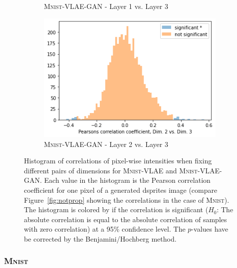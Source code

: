 \begin{figure}
\begin{subfigure}{.3\textwidth}
        \caption{\textsc{Mnist}-VLAE-GAN - Layer 1 vs. Layer 3}
    \end{subfigure}
    \hfill
    \begin{subfigure}{.3\textwidth}
        \includegraphics[width=\textwidth]{images/notprop/dsprites/vlae_gan/dim_2_3.png}
        \caption{\textsc{Mnist}-VLAE-GAN - Layer 2 vs. Layer 3}
    \end{subfigure}
    \caption[\textsc{Mnist}-VLAE and \textsc{Mnist}-VLAE-GAN - Pixel intensity correlation]{Histogram of correlations of pixel-wise intensities when fixing different pairs of dimensions for \textsc{Mnist}-\ac{VLAE} and \textsc{Mnist}-\ac{VLAE}-\ac{GAN}.
    Each value in the histogram is the Pearson correlation coefficient for one pixel of a generated dsprites image (compare Figure~\ref{fig:notprop} showing the correlations in the case of \textsc{Mnist}).
    The histogram is colored by if the correlation is significant ($H_0$: The absolute correlation is equal to the absolute correlation of samples with zero correlation) at a 95\% confidence level.
    The $p$-values have be corrected by the Benjamini/Hochberg method.}
    \label{fig:mnist_vlae_notprop}
\end{figure}

\subsubsection{\textsc{Mnist}}

